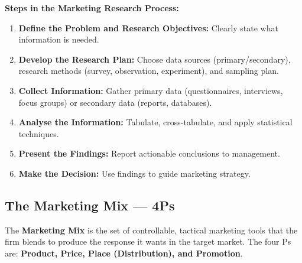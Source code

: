 \documentclass[12pt,a4paper]{article}
\begin{document}
\textbf{Steps in the Marketing Research Process:}
\begin{enumerate}[label=\textbf{\arabic*.}, leftmargin=*, itemsep=3pt, topsep=2pt]
  \item \textbf{Define the Problem and Research Objectives:} Clearly state what information is needed.
  \item \textbf{Develop the Research Plan:} Choose data sources (primary/secondary), research methods (survey, observation, experiment), and sampling plan.
  \item \textbf{Collect Information:} Gather primary data (questionnaires, interviews, focus groups) or secondary data (reports, databases).
  \item \textbf{Analyse the Information:} Tabulate, cross-tabulate, and apply statistical techniques.
  \item \textbf{Present the Findings:} Report actionable conclusions to management.
  \item \textbf{Make the Decision:} Use findings to guide marketing strategy.
\end{enumerate}

\subsection{The Marketing Mix --- 4Ps}

\begin{tcolorbox}[defbox, title={\textbf{Marketing Mix (4Ps)}}]
The \textbf{Marketing Mix} is the set of controllable, tactical marketing tools that the firm blends to produce the response it wants in the target market. The four Ps are: \textbf{Product, Price, Place (Distribution), and Promotion}.
\end{tcolorbox}
\end{document}
